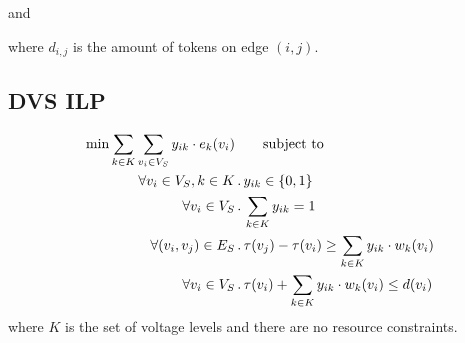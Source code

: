 and


where $d_{i,j}$ is the amount of tokens on edge $(i,j)$.

\subsection{DVS ILP}
\begin{align*}
	\min \sum_{k \in K} \sum_{v_i \in V_S} y_{ik} \cdot e_k(v_i) &\qquad\text{subject to} \\
	\forall v_i \in V_S, k \in K &\,.\, y_{ik} \in \left\lbrace 0,1 \right\rbrace \\
	\forall v_i \in V_S &\,.\, \sum_{k \in K} y_{ik} = 1 \\
	\forall (v_i, v_j) \in E_S &\,.\, \tau(v_j) - \tau(v_i) \geq \sum_{k \in K} y_{ik} \cdot w_k(v_i) \\
	\forall v_i \in V_S & \,.\, \tau(v_i) + \sum_{k \in K} y_{ik} \cdot w_k(v_i) \leq d(v_i)
\end{align*}
where $K$ is the set of voltage levels and there are no resource constraints.
